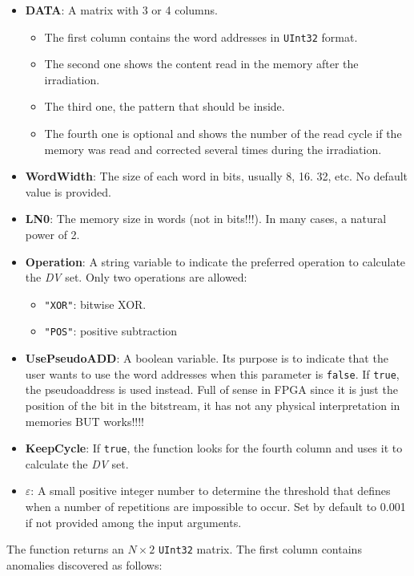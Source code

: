 \begin{itemize}
\begin{itemize}
 			\item   \textbf{DATA}: A matrix with 3 or 4 columns. 
 			\begin{itemize}
 				\item The first column contains the word addresses in \texttt{UInt32} format.
 				\item The second one shows the content read in the memory after the irradiation.
 				\item The third one, the pattern that should be inside.
 				\item  The fourth one is optional and shows the number of the read cycle if the   memory was read and corrected several times during the irradiation.
 			\end{itemize}
 			\item   \textbf{WordWidth}: The size of each word in bits, usually 8, 16. 32, etc. No default value is provided.
 			\item   \textbf{LN0}: The memory size in words (not in bits!!!). In many cases, a natural power of 2.
 			\item   \textbf{Operation}: A string variable to indicate the preferred operation to calculate
 			the \textit{DV} set. Only two operations are allowed: 
 			\begin{itemize}
 				\item \texttt{"XOR"}: bitwise XOR.
 				\item\texttt{"POS"}: positive subtraction
 			\end{itemize}
 			\item  \textbf{UsePseudoADD}: A boolean variable. Its purpose is to indicate that the user wants to use the word addresses when this parameter is \texttt{false}. If \texttt{true}, the pseudoaddress  is used instead. Full of sense in FPGA since it is just the position  of the bit in the bitstream, it has not any physical interpretation in memories BUT works!!!!
 			\item   \textbf{KeepCycle}: If \texttt{true}, the function looks for the fourth column and uses it to calculate the \textit{DV} set.
 			\item   \textbf{\(\varepsilon\)}: A small positive integer number to determine the threshold that defines when a number of repetitions are impossible to occur. Set by default to 0.001 if not provided among the input arguments.
 			
 		\end{itemize}
 		
 		The function returns an \(N\times 2\) \texttt{UInt32} matrix. The first column contains anomalies discovered as follows:
 		

\end{itemize}
